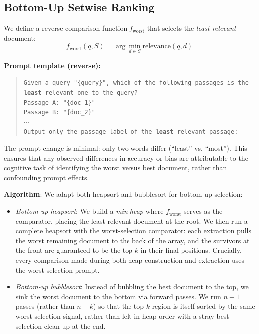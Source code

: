 \subsection{Bottom-Up Setwise Ranking}
\label{sec:bottomup}

We define a reverse comparison function $f_{\text{worst}}$ that selects the \emph{least relevant} document:
\begin{equation}
f_{\text{worst}}(q, S) = \arg\min_{d \in S} \text{relevance}(q, d)
\label{eq:fworst}
\end{equation}

\textbf{Prompt template (reverse):}
\begin{quote}
\small\texttt{Given a query "\{query\}", which of the following passages is the \textbf{least} relevant one to the query?}\\
\texttt{Passage A: "\{doc\_1\}"}\\
\texttt{Passage B: "\{doc\_2\}"}\\
$\cdots$\\
\texttt{Output only the passage label of the \textbf{least} relevant passage:}
\end{quote}

The prompt change is minimal: only two words differ (``least'' vs. ``most''). This ensures that any observed differences in accuracy or bias are attributable to the cognitive task of identifying the worst versus best document, rather than confounding prompt effects.

\textbf{Algorithm}: We adapt both heapsort and bubblesort for bottom-up selection:
\begin{itemize}[leftmargin=*]
\item \emph{Bottom-up heapsort}: We build a \emph{min-heap} where $f_{\text{worst}}$ serves as the comparator, placing the least relevant document at the root. We then run a complete heapsort with the worst-selection comparator: each extraction pulls the worst remaining document to the back of the array, and the survivors at the front are guaranteed to be the top-$k$ in their final positions. Crucially, every comparison made during both heap construction and extraction uses the worst-selection prompt.
\item \emph{Bottom-up bubblesort}: Instead of bubbling the best document to the top, we sink the worst document to the bottom via forward passes. We run $n-1$ passes (rather than $n-k$) so that the top-$k$ region is itself sorted by the same worst-selection signal, rather than left in heap order with a stray best-selection clean-up at the end.
\end{itemize}

